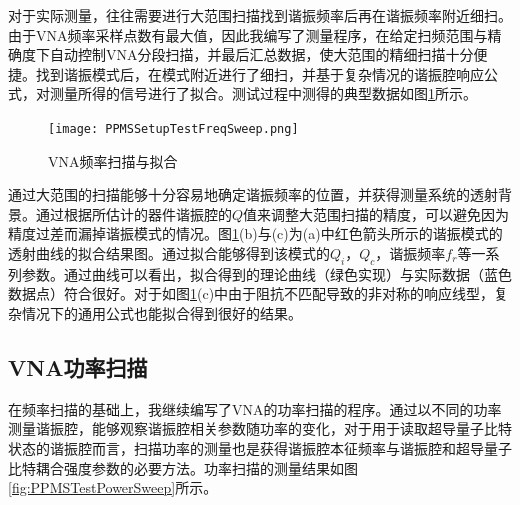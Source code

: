                   对于实际测量，往往需要进行大范围扫描找到谐振频率后再在谐振频率附近细扫。由于VNA频率采样点数有最大值，因此我编写了测量程序，在给定扫频范围与精确度下自动控制VNA分段扫描，并最后汇总数据，使大范围的精细扫描十分便捷。找到谐振模式后，在模式附近进行了细扫，并基于复杂情况的谐振腔响应公式，对测量所得的信号进行了拟合。测试过程中测得的典型数据如图\ref{fig:PPMSSetupTestFreqSweep}所示。
                  
                        
            \begin{figure}[h]
                \centering
                \texttt{[image: PPMSSetupTestFreqSweep.png]}
                \caption{VNA频率扫描与拟合}
                \label{fig:PPMSSetupTestFreqSweep}
            \end{figure}

            通过大范围的扫描能够十分容易地确定谐振频率的位置，并获得测量系统的透射背景。通过根据所估计的器件谐振腔的$Q$值来调整大范围扫描的精度，可以避免因为精度过差而漏掉谐振模式的情况。图\ref{fig:PPMSSetupTestFreqSweep}(b)与(c)为(a)中红色箭头所示的谐振模式的透射曲线的拟合结果图。通过拟合能够得到该模式的$Q_i$，$Q_c$，谐振频率$f_r$等一系列参数。通过曲线可以看出，拟合得到的理论曲线（绿色实现）与实际数据（蓝色数据点）符合很好。对于如图\ref{fig:PPMSSetupTestFreqSweep}(c)中由于阻抗不匹配导致的非对称的响应线型，复杂情况下的通用公式也能拟合得到很好的结果。



                  \subsection{VNA功率扫描} %
                  \label{sub:vna功率扫描}

                  在频率扫描的基础上，我继续编写了VNA的功率扫描的程序。通过以不同的功率测量谐振腔，能够观察谐振腔相关参数随功率的变化\cite{Day2003,Gao2008Thesis}，对于用于读取超导量子比特状态的谐振腔而言，扫描功率的测量也是获得谐振腔本征频率与谐振腔和超导量子比特耦合强度参数的必要方法\cite{Blais2004,Blais2007,schuster2007circuit}。功率扫描的测量结果如图\ref{fig:PPMSTestPowerSweep}所示。


